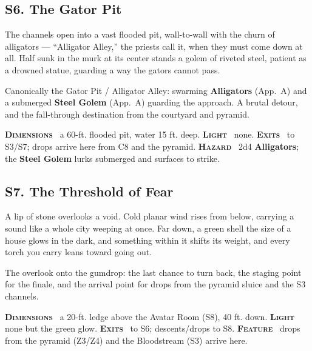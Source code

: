 \documentclass[10pt,twoside]{article}
\newcommand{\tech}[1]{\textbf{\scshape\textcolor{stone}{#1}}\ }
\begin{document}
\subsection{S6. The Gator Pit}
\begin{readaloud}
The channels open into a vast flooded pit, wall-to-wall with the churn of alligators
--- ``Alligator Alley,'' the priests call it, when they must come down at all. Half
sunk in the murk at its center stands a golem of riveted steel, patient as a drowned
statue, guarding a way the gators cannot pass.
\end{readaloud}
Canonically the Gator Pit / Alligator Alley: swarming \textbf{Alligators} (App.\ A)
and a submerged \textbf{Steel Golem} (App.\ A) guarding the approach. A brutal detour,
and the fall-through destination from the courtyard and pyramid.

\begin{techbox}
\tech{Dimensions} a 60-ft. flooded pit, water 15 ft. deep. \tech{Light} none.
\tech{Exits} to S3/S7; drops arrive here from C8 and the pyramid. \tech{Hazard} 2d4
\textbf{Alligators}; the \textbf{Steel Golem} lurks submerged and surfaces to strike.
\end{techbox}

\subsection{S7. The Threshold of Fear}
\begin{readaloud}
A lip of stone overlooks a void. Cold planar wind rises from below, carrying a sound
like a whole city weeping at once. Far down, a green shell the size of a house glows
in the dark, and something within it shifts its weight, and every torch you carry
leans toward going out.
\end{readaloud}
The overlook onto the gumdrop: the last chance to turn back, the staging point for the
finale, and the arrival point for drops from the pyramid sluice and the S3 channels.

\begin{techbox}
\tech{Dimensions} a 20-ft. ledge above the Avatar Room (S8), 40 ft. down. \tech{Light}
none but the green glow. \tech{Exits} to S6; descents/drops to S8. \tech{Feature}
drops from the pyramid (Z3/Z4) and the Bloodstream (S3) arrive here.
\end{techbox}
\end{document}
